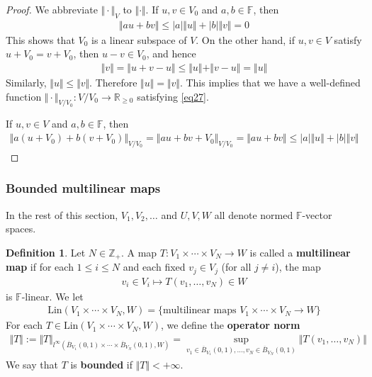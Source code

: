 \documentclass[12pt,b5paper,notitlepage]{article}
\theoremstyle{definition}
\newtheorem{df}{Definition}[subsection]
\theoremstyle{plain}
\newcommand{\ovl}{\overline}
\newcommand{\Zbb}{\mathbb Z}
\newcommand{\Rbb}{\mathbb R}
\newcommand{\Fbb}{\mathbb F}
\newcommand{\Lin}{\mathrm{Lin}}
\numberwithin{equation}{section}
\begin{document}
\begin{proof}
We abbreviate $\Vert\cdot\Vert_V$ to $\Vert\cdot\Vert$. If $u,v\in V_0$ and $a,b\in\Fbb$, then
\begin{align*}
\Vert au+bv\Vert\leq |a|\Vert u\Vert+|b|\Vert v\Vert=0
\end{align*}
This shows that $V_0$ is a linear subspace of $V$. On the other hand, if $u,v\in V$ satisfy $u+V_0=v+V_0$, then $u-v\in V_0$, and hence
\begin{align*}
\Vert v\Vert=\Vert u+v-u\Vert\leq\Vert u\Vert+\Vert v-u\Vert=\Vert u\Vert
\end{align*}
Similarly, $\Vert u\Vert\leq\Vert v\Vert$. Therefore $\Vert u\Vert=\Vert v\Vert$. This implies that we have a well-defined function $\Vert\cdot\Vert_{V/V_0}:V/V_0\rightarrow\Rbb_{\geq0}$ satisfying \eqref{eq27}.

If $u,v\in V$ and $a,b\in\Fbb$, then
\begin{align*}
\Vert a(u+V_0)+b(v+V_0)\Vert_{V/V_0}=\Vert au+bv+V_0\Vert_{V/V_0}=\Vert au+bv\Vert\leq |a|\Vert u\Vert+|b|\Vert v\Vert
\end{align*}
\end{proof}








\subsubsection{Bounded multilinear maps}

In the rest of this section,  $V_1,V_2,\dots$ and $U,V,W$ all denote normed $\Fbb$-vector spaces.

\begin{df}
Let $N\in\Zbb_+$. A map $T:V_1\times\cdots\times V_N\rightarrow W$ is called a \textbf{multilinear map}  if for each $1\leq i\leq N$ and each fixed $v_j\in V_j$ (for all $j\neq i$), the map
\begin{align*}
v_i\in V_i\mapsto T(v_1,\dots,v_N)\in W
\end{align*}
is $\Fbb$-linear. We let \index{Lin@$\Lin(V_1\times\cdots\times V_N,W)$}
\begin{align*}
\Lin(V_1\times\cdots\times V_N,W)=\{\text{multilinear maps }V_1\times\cdots\times V_N\rightarrow W\}
\end{align*}
For each $T\in \Lin(V_1\times\cdots\times V_N,W)$, we define the \textbf{operator norm}
\begin{align*}
\Vert T\Vert:=\Vert T\Vert_{l^\infty(\ovl B_{V_1}(0,1)\times\cdots\times\ovl B_{V_N}(0,1),W)}=\sup_{v_1\in\ovl B_{V_1}(0,1),\dots,v_N\in\ovl B_{V_N}(0,1)}\Vert T(v_1,\dots,v_N)\Vert
\end{align*}
We say that $T$ is \textbf{bounded}  if $\Vert T\Vert<+\infty$. 
\end{df}
\end{document}
